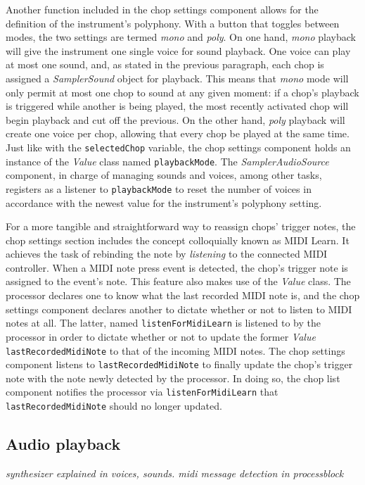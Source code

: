 \documentclass[12pt, a4paper, hidelinks]{article}
\begin{document}
	Another function included in the chop settings component allows for the definition of the instrument's polyphony. With a button that toggles between modes, the two settings are termed \textit{mono} and \textit{poly}. On one hand, \textit{mono} playback will give the instrument one single voice for sound playback. One voice can play at most one sound, and, as stated in the previous paragraph, each chop is assigned a \textit{SamplerSound} object for playback. This means that \textit{mono} mode will only permit at most one chop to sound at any given moment: if a chop's playback is triggered while another is being played, the most recently activated chop will begin playback and cut off the previous. On the other hand, \textit{poly} playback will create one voice per chop, allowing that every chop be played at the same time. Just like with the \texttt{selectedChop} variable, the chop settings component holds an instance of the \textit{Value} class named \texttt{playbackMode}. The \textit{SamplerAudioSource} component, in charge of managing sounds and voices, among other tasks, registers as a listener to \texttt{playbackMode} to reset the number of voices in accordance with the newest value for the instrument's polyphony setting.\par
	
	For a more tangible and straightforward way to reassign chops' trigger notes, the chop settings section includes the concept colloquially known as MIDI Learn. It achieves the task of rebinding the note by \textit{listening} to the connected MIDI controller. When a MIDI note press event is detected, the chop's trigger note is assigned to the event's note. This feature also makes use of the \textit{Value} class.  The processor declares one to know what the last recorded MIDI note is, and the chop settings component declares another to dictate whether or not to listen to MIDI notes at all. The latter, named \texttt{listenForMidiLearn} is listened to by the processor in order to dictate whether or not to update the former \textit{Value} \texttt{lastRecordedMidiNote} to that of the incoming MIDI notes. The chop settings component listens to \texttt{lastRecordedMidiNote} to finally update the chop's trigger note with the note newly detected by the processor. In doing so, the chop list component notifies the processor via \texttt{listenForMidiLearn} that \texttt{lastRecordedMidiNote} should no longer updated.
	
	

	
	
	
	\newpage
	\subsection{Audio playback}
	\textit{	synthesizer explained in voices, sounds. midi message detection in processblock }
	\par
	
\end{document}
